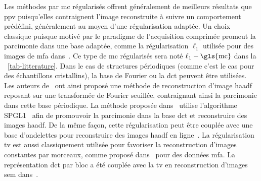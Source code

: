 Les méthodes par \gls{mc} régularisés offrent généralement de meilleurs résultats que \gls{ppv} puisqu'elles contraignent l'image reconstruite à suivre un comportement prédéfini, généralement au moyen d'une régularisation adaptée. Un choix classique puisque motivé par le paradigme de l'acquisition comprimée promeut la parcimonie dans une base adaptée, comme la régularisation $\ell_1$ utilisée pour des images de \gls{mfa} dans~\cite{han2018optimal}. Ce type de \gls{mc} régularisés sera noté $\ell_1-\mathrm{\gls{mc}}$ dans la \tabname~\ref{tab-litterature}. %
Dans le cas de structures périodiques (comme c'est le cas pour des échantillons cristallins), la base de Fourier ou la \gls{dct} peuvent être utilisées. Les auteurs de~\cite{stevens2018apl} ont ainsi proposé une méthode de reconstruction d'image \gls{haadf} reposant sur une transformée de Fourier seuillée, contraignant ainsi la parcimonie dans cette base périodique. La méthode proposée dans~\cite{beche2016development} utilise l'algorithme SPGL1~\cite{berg2008probing} afin de promouvoir la parcimonie dans la base \gls{dct} et reconstruire des images \gls{haadf}. De la même façon, cette régularisation peut être couplée avec une base d'ondelettes pour reconstruire des images \gls{haadf} en ligne~\cite{li2018compressed}. %
%
La régularisation \gls{tv} est aussi classiquement utilisée pour favoriser la reconstruction d'images constantes par morceaux, comme proposé dans~\cite{han2018optimal} pour des données \gls{mfa}. La représentation \gls{dct} par bloc a été couplée avec la \gls{tv} en reconstruction d'images \gls{sem} dans~\cite{anderson2013sparse}.%



